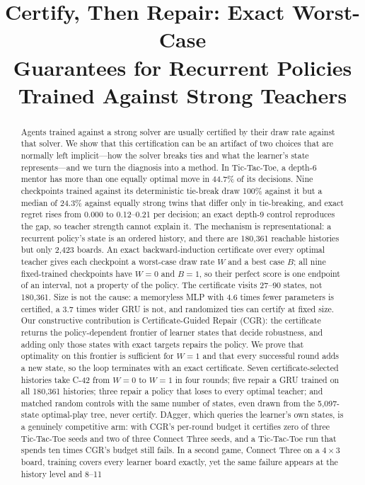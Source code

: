 \documentclass[conference]{IEEEtran}
\begin{document}
\title{Certify, Then Repair: Exact Worst-Case\\ Guarantees for Recurrent Policies\\ Trained Against Strong Teachers}

\author{
}

\maketitle

\begin{abstract}
Agents trained against a strong solver are usually certified by their draw rate against that solver. We show that this certification can be an artifact of two choices that are normally left implicit---how the solver breaks ties and what the learner's state represents---and we turn the diagnosis into a method. In Tic-Tac-Toe, a depth-6 mentor has more than one equally optimal move in 44.7\% of its decisions. Nine checkpoints trained against its deterministic tie-break draw 100\% against it but a median of 24.3\% against equally strong twins that differ only in tie-breaking, and exact regret rises from 0.000 to 0.12--0.21 per decision; an exact depth-9 control reproduces the gap, so teacher strength cannot explain it. The mechanism is representational: a recurrent policy's state is an ordered history, and there are 180{,}361 reachable histories but only 2{,}423 boards. An exact backward-induction certificate over every optimal teacher gives each checkpoint a worst-case draw rate $W$ and a best case $B$; all nine fixed-trained checkpoints have $W=0$ and $B=1$, so their perfect score is one endpoint of an interval, not a property of the policy. The certificate visits 27--90 states, not 180{,}361. Size is not the cause: a memoryless MLP with 4.6 times fewer parameters is certified, a 3.7 times wider GRU is not, and randomized ties can certify at fixed size. Our constructive contribution is Certificate-Guided Repair (CGR): the certificate returns the policy-dependent frontier of learner states that decide robustness, and adding only those states with exact targets repairs the policy. We prove that optimality on this frontier is sufficient for $W=1$ and that every successful round adds a new state, so the loop terminates with an exact certificate. Seven certificate-selected histories take C-42 from $W=0$ to $W=1$ in four rounds; five repair a GRU trained on all 180{,}361 histories; three repair a policy that loses to every optimal teacher; and matched random controls with the same number of states, even drawn from the 5{,}097-state optimal-play tree, never certify. DAgger, which queries the learner's own states, is a genuinely competitive arm: with CGR's per-round budget it certifies zero of three Tic-Tac-Toe seeds and two of three Connect Three seeds, and a Tic-Tac-Toe run that spends ten times CGR's budget still fails. In a second game, Connect Three on a $4\times3$ board, training covers every learner board exactly, yet the same failure appears at the history level and 8--11 
\end{abstract}
\end{document}
